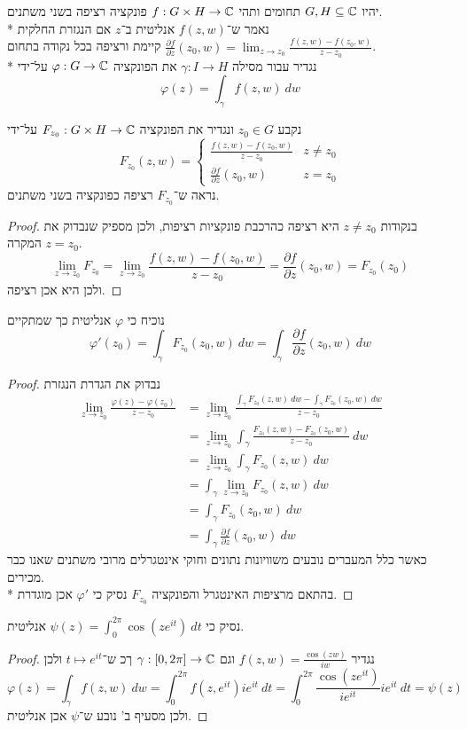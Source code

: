 \question{}
יהיו $G, H \subseteq \mathbb{C}$ תחומים ותהי $f : G \times H \to \mathbb{C}$ פונקציה רציפה בשני משתנים. \\*
נאמר ש־$f(z, w)$ אנליטית ב־$z$ אם הנגזרת החלקית $\frac{\partial f}{\partial z}(z_0, w) = \lim_{z \to z_0} \frac{f(z, w) - f(z_0, w)}{z - z_0}$ קיימת ורציפה בכל נקודה בתחום. \\*
נגדיר עבור מסילה $\gamma : I \to H$ את הפונקציה $\varphi : G \to \mathbb{C}$ על־ידי
\[
	\varphi(z) = \int_\gamma f(z, w)\ dw
\]

\subquestion{}
נקבע $z_0 \in G$ ונגדיר את הפונקציה $F_{z_0} : G \times H \to \mathbb{C}$ על־ידי
\[
	F_{z_0}(z, w) = \begin{cases}
		\frac{f(z, w) - f(z_0, w)}{z - z_0} & z \ne z_0 \\
		\frac{\partial f}{\partial z}(z_0, w) & z = z_0
	\end{cases}
\]
נראה ש־$F_{z_0}$ רציפה כפונקציה בשני משתנים.
\begin{proof}
	בנקודות $z \ne z_0$ היא רציפה כהרכבת פונקציות רציפות, ולכן מספיק שנבדוק את המקרה $z = z_0$.
	\[
		\lim_{z \to z_0} F_{z_0}
		= \lim_{z \to z_0} \frac{f(z, w) - f(z_0, w)}{z - z_0}
		= \frac{\partial f}{\partial z}(z_0, w)  
		= F_{z_0}(z_0)
	\]
	ולכן היא אכן רציפה.
\end{proof}

\subquestion{}
נוכיח כי $\varphi$ אנליטית כך שמתקיים
\[
	\varphi'(z_0)
	= \int_\gamma F_{z_0}(z_0, w)\ dw
	= \int_\gamma \frac{\partial f}{\partial z}(z_0, w)\ dw
\]
\begin{proof}
	נבדוק את הגדרת הנגזרת
	\begin{align*}
		\lim_{z \to z_0} \frac{\varphi(z) - \varphi(z_0)}{z - z_0}
		& = \lim_{z \to z_0} \frac{\int_\gamma F_{z_0}(z, w)\ dw - \int_\gamma F_{z_0}(z_0, w)\ dw }{z - z_0} \\
		& = \lim_{z \to z_0} \int_\gamma \frac{F_{z_0}(z, w) - F_{z_0}(z_0, w)}{z - z_0}\ dw \\
		& = \lim_{z \to z_0} \int_\gamma F_{z_0}(z, w)\ dw \\
		& = \int_\gamma \lim_{z \to z_0} F_{z_0}(z, w)\ dw \\
		& = \int_\gamma F_{z_0}(z_0, w)\ dw \\
		& = \int_\gamma \frac{\partial f}{\partial z}(z_0, w)\ dw
	\end{align*}
	כאשר כלל המעברים נובעים משוויונות נתונים וחוקי אינטגרלים מרובי משתנים שאנו כבר מכירים. \\*
	בהתאם מרציפות האינטגרל והפונקציה $F_{z_0}$ נסיק כי $\varphi'$ אכן מוגדרת.
\end{proof}

\subquestion{}
נסיק כי $\psi(z) = \int_0^{2\pi} \cos(z e^{it})\ dt$ אנליטית.
\begin{proof}
	נגדיר $f(z, w) = \frac{\cos(zw)}{iw}$ וגם $\gamma : [0, 2\pi] \to \mathbb{C}$ ךכ ש־$t \mapsto e^{it}$ ולכן
	\[
		\varphi(z)
		= \int_\gamma f(z, w)\ dw
		= \int_0^{2\pi} f(z, e^{it}) ie^{it}\ dt
		= \int_0^{2\pi} \frac{\cos(z e^{it})}{ie^{it}} ie^{it}\ dt
		= \psi(z)
	\]
	ולכן מסעיף ב' נובע ש־$\psi$ אכן אנליטית.
\end{proof}


